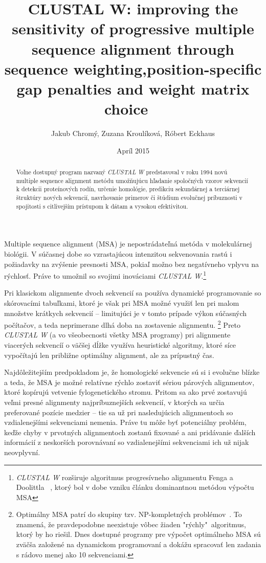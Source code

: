 \documentclass[nobib]{tufte-handout}
\title{CLUSTAL W: improving the sensitivity of progressive multiple sequence alignment through sequence weighting,position-specific gap penalties and weight matrix choice ~\citep{clustal}}
\author{Jakub Chromý, Zuzana Kroulíková, Róbert Eckhaus}
\date{Apríl 2015} %
\newcommand{\tg}[1]{}%
\newcommand{\tr}[1]{}%
\newcommand{\tb}[1]{#1}%
\begin{document}
\maketitle
\begin{abstract} \tb{\noindent
Voľne dostupný program nazvaný \emph{CLUSTAL W} predstavoval v roku 1994 novú multiple sequence alignment metódu umožňujúcu hľadanie spoločných vzorov sekvencií k detekcii proteínových rodín, určenie homológie, predikciu sekundárnej a terciárnej štruktúry nových sekvencií, navrhovanie primerov či štúdium evolučnej príbuznosti v spojitosti s citlivejším prístupom k dátam a vysokou efektivitou.}
\end{abstract}

\justify
Multiple sequence alignment (MSA) je nepostrádateľná metóda v molekulárnej biológii. V súčasnej dobe so vzrastajúcou intenzitou sekvenovania rastú i požiadavky na zvýšenie presnosti MSA, \tr{a} pokiaľ možno bez negatívneho vplyvu na rýchlosť. Práve to umožnil so svojimi inováciami \emph{CLUSTAL W}.\footnote{\emph{CLUSTAL W} rozširuje algoritmus progresívneho alignmentu Fenga a Doolittla ~\citep{fng}, ktorý bol v dobe vzniku článku dominantnou metódou výpočtu MSA}


Pri klasickom alignmente dvoch sekvencií sa používa dynamické programovanie so skórovacími tabuľkami, ktoré je však pri MSA možné využiť len pri malom množstve krátkych sekvencií
 – limitujúci je v tomto prípade výkon súčasných počítačov, a teda neprimerane dlhá doba na zostavenie alignmentu.
 \footnote{Optimálny MSA patrí do skupiny tzv. NP-kompletných problémov~\citep{complexity}. To znamená, že pravdepodobne neexistuje vôbec žiaden "rýchly"\ algoritmus, ktorý by ho riešil. Dnes dostupné programy pre výpočet optimálneho MSA sú zväčša založené na dynamickom programovaní a dokážu spracovať len zadania s rádovo menej ako 10 sekvenciami.}
  Preto \emph{CLUSTAL W} (a vo všeobecnosti všetky MSA programy) pri alignmente  \tb{viacerých} sekvencíí o väčšej dĺžke využíva heuristické algoritmy\tb{, ktoré síce vypočítajú len približne optimálny alignment, ale za prípustný čas.} \tr{, ktoré umožňujú flexibilne voliť pokračovanie výpočtu, tj. ktoré data, v akom poradí a ako sa budú spracovávať. }\tg{[note: toto je uz popis progresivneho pristupu, t.j. jednej konkretnej heuristiky. Ine algoritmy mozu postupovat inak]}


Najdôležitejším predpokladom je, že homologické sekvencie sú si i evolučne blízke a teda, že\tr{prvotný} MSA je možné relatívne rýchlo zostaviť sériou párových alignmentov, ktoré kopírujú vetvenie fylogenetického stromu. Pritom sa ako prvé zostavujú veľmi presné alignmenty najpríbuznejších sekvencií, v ktorých sa určia preferované pozície medzier – tie sa už pri nasledujúcich alignmentoch so vzdialenejšími sekvenciami nemenia. Práve tu môže byť potenciálny problém, keďže chyby v prvotných alignmentoch zostanú fixované a ani pridávanie ďalších informácií z neskorších porovnávaní so vzdialenejšími sekvenciami ich už nijak neovplyvní. 
\end{document}
